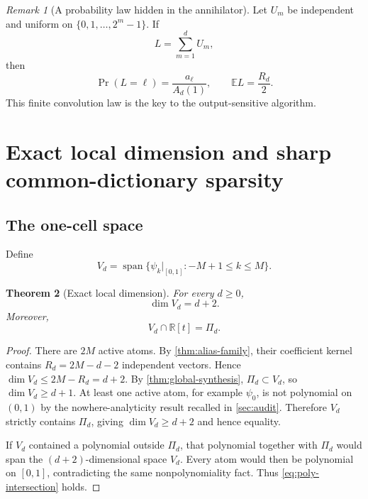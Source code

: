 \documentclass[11pt,oneside]{article}
\newtheorem{theorem}{Theorem}[section]
\theoremstyle{definition}
\theoremstyle{remark}
\newtheorem{remark}[theorem]{Remark}
\newcommand{\R}{\mathbb R}
\newcommand{\E}{\mathbb E}
\newcommand{\Span}{\operatorname{span}}
\begin{document}
\begin{remark}[A probability law hidden in the annihilator]
Let $U_m$ be independent and uniform on $\{0,1,\ldots,2^m-1\}$.  If
\begin{equation}
 L=\sum_{m=1}^{d}U_m,                                     \label{eq:L-random}
\end{equation}
then
\begin{equation}
 \Pr(L=\ell)=\frac{a_\ell}{A_d(1)},
 \qquad \E L=\frac{R_d}{2}.                              \label{eq:L-law}
\end{equation}
This finite convolution law is the key to the output-sensitive algorithm.
\end{remark}

\section{Exact local dimension and sharp common-dictionary sparsity}
\label{sec:dimension}

\subsection{The one-cell space}
Define
\begin{equation}
 V_d=\Span\{\psi_k|_{[0,1]}:-M+1\le k\le M\}.            \label{eq:Vd}
\end{equation}

\begin{theorem}[Exact local dimension]
\label{thm:local-dim}
For every $d\ge0$,
\begin{equation}
 \boxed{\dim V_d=d+2.}                                    \label{eq:local-dim}
\end{equation}
Moreover,
\begin{equation}
 V_d\cap\R[t]=\Pi_d.                                      \label{eq:poly-intersection}
\end{equation}
\end{theorem}

\begin{proof}
There are $2M$ active atoms.  By \cref{thm:alias-family}, their coefficient kernel contains $R_d=2M-d-2$ independent vectors.  Hence
\(
 \dim V_d\le2M-R_d=d+2.
\)
By \cref{thm:global-synthesis}, $\Pi_d\subset V_d$, so $\dim V_d\ge d+1$.  At least one active atom, for example $\psi_0$, is not polynomial on $(0,1)$ by the nowhere-analyticity result recalled in \cref{sec:audit}.  Therefore $V_d$ strictly contains $\Pi_d$, giving $\dim V_d\ge d+2$ and hence equality.

If $V_d$ contained a polynomial outside $\Pi_d$, that polynomial together with $\Pi_d$ would span the $(d+2)$-dimensional space $V_d$.  Every atom would then be polynomial on $[0,1]$, contradicting the same nonpolynomiality fact.  Thus \eqref{eq:poly-intersection} holds.
\end{proof}
\end{document}
